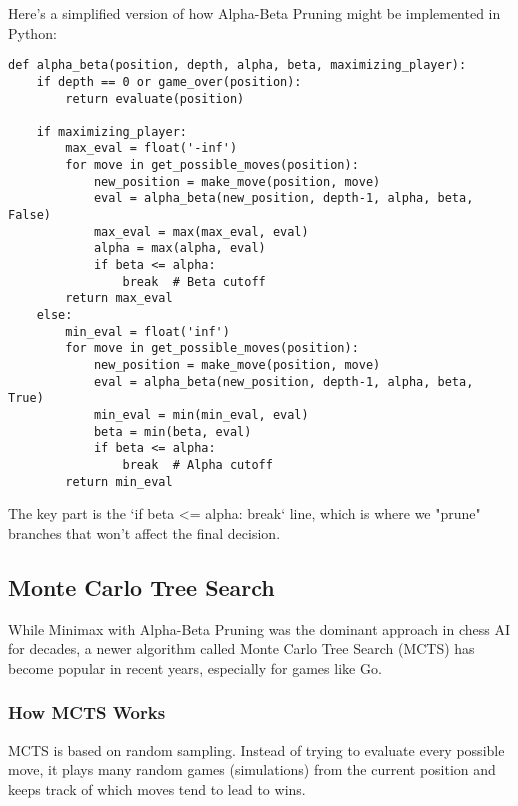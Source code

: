 \documentclass[11pt]{article}
\begin{document}
Here's a simplified version of how Alpha-Beta Pruning might be implemented in Python:

\begin{lstlisting}[style=Python]
def alpha_beta(position, depth, alpha, beta, maximizing_player):
    if depth == 0 or game_over(position):
        return evaluate(position)

    if maximizing_player:
        max_eval = float('-inf')
        for move in get_possible_moves(position):
            new_position = make_move(position, move)
            eval = alpha_beta(new_position, depth-1, alpha, beta, False)
            max_eval = max(max_eval, eval)
            alpha = max(alpha, eval)
            if beta <= alpha:
                break  # Beta cutoff
        return max_eval
    else:
        min_eval = float('inf')
        for move in get_possible_moves(position):
            new_position = make_move(position, move)
            eval = alpha_beta(new_position, depth-1, alpha, beta, True)
            min_eval = min(min_eval, eval)
            beta = min(beta, eval)
            if beta <= alpha:
                break  # Alpha cutoff
        return min_eval
\end{lstlisting}

The key part is the `if beta <= alpha: break` line, which is where we "prune" branches that won't affect the final decision.

\subsection{Monte Carlo Tree Search}

While Minimax with Alpha-Beta Pruning was the dominant approach in chess AI for decades, a newer algorithm called Monte Carlo Tree Search (MCTS) has become popular in recent years, especially for games like Go.

\subsubsection{How MCTS Works}

MCTS is based on random sampling. Instead of trying to evaluate every possible move, it plays many random games (simulations) from the current position and keeps track of which moves tend to lead to wins.
\end{document}
